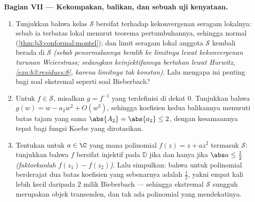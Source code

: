 \begin{problem}
\begin{enumerate}[resume]
\end{enumerate}
\medskip
\noindent\textbf{Bagian VII --- Kekompakan, balikan, dan sebuah
uji kenyataan.}
\begin{enumerate}[resume]
  \item Tunjukkan bahwa kelas $\mathcal S$ bersifat \emph{}
        terhadap kekonvergenan seragam lokalnya: sebab ia terbatas
        lokal menurut teorema pertumbuhannya, sehingga normal
        (\cref{thm:b3:conformal:montel}); dan limit seragam
        lokal anggota $\mathcal S$ kembali berada di
        $\mathcal S$ \emph{(sebab penormalannya beralih ke
        limitnya lewat kekonvergenan turunan Weierstrass;
        sedangkan keinjektifannya bertahan lewat Hurwitz,
        \cref{exo:b3:residues:8}, karena limitnya
        tak konstan)}. Lalu mengapa ini penting bagi soal
        ekstremal seperti soal Bieberbach?
  \item Untuk $f \in \mathcal S$, misalkan $g = f^{-1}$ yang terdefinisi
        di dekat $0$. Tunjukkan bahwa $g(w) = w - a_2w^2 + O(w^3)$, sehingga
        koefisien kedua balikannya menuruti batas tajam yang sama
        $\abs{A_2} = \abs{a_2} \leq 2$, dengan kesamaannya
        tepat bagi fungsi Koebe yang dirotasikan.
  \item Tentukan untuk $a \in \C$ yang mana polinomial $f(z)
        = z + az^2$ termasuk $\mathcal S$: tunjukkan bahwa $f$ bersifat
        injektif pada $\mathbb D$ jika dan hanya jika $\abs a \leq \frac12$
        \emph{(faktorkanlah $f(z_1) - f(z_2)$)}. Lalu simpulkan: bahwa untuk
        polinomial berderajat dua batas koefisien yang sebenarnya adalah
        $\frac12$, yakni empat kali lebih kecil daripada $2$ milik Bieberbach
        --- sehingga ekstremal $\mathcal S$ sungguh merupakan objek
        transenden, dan tak ada polinomial yang mendekatinya.

\end{enumerate}
\end{problem}

